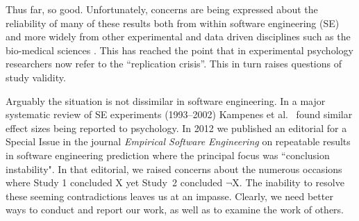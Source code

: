 \documentclass[10pt]{elsarticle}
\begin{document}
Thus far, so good.  Unfortunately, concerns are being expressed about the reliability of many of these results both from within software engineering (SE) \cite{Shep14,Jorg16} and more widely from other experimental and data driven disciplines such as the bio-medical sciences \cite{Ioan05,Earp15}.  This has reached the point that in experimental psychology researchers now refer to the ``replication crisis''.  This in turn raises questions of study validity.

Arguably the situation is not  dissimilar in software engineering.  In a major systematic review of SE experiments (1993--2002) Kampenes et al.~\cite{Kamp07} found similar effect sizes being reported to psychology. In 2012 we published an editorial for a Special Issue in the journal \textit{Empirical Software Engineering} on repeatable results in software engineering prediction \cite{menzies12} where the principal focus was ``conclusion instability".  In that editorial, we raised concerns about the numerous occasions where Study 1 concluded X yet Study~2 concluded $\neg$X.  The inability to resolve these seeming contradictions leaves us at an impasse.  Clearly, we need better ways to conduct and report our work, as well as to examine the work of others.
\end{document}
